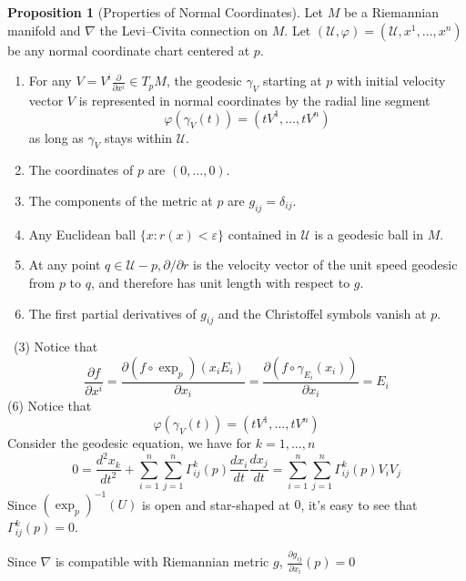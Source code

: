 \documentclass[12pt,a4paper]{book}
\newenvironment{prooff}{{\noindent\it\textcolor{cyan!40!black}{Proof}:}\,}{\par}
\newenvironment{enu}{\begin{enumerate}[(1)]}{\end{enumerate}}
\theoremstyle{definition}
\newtheorem{prop}[defn]{Proposition}
\begin{document}
\begin{prop}[Properties of Normal Coordinates]
    Let $M$ be a Riemannian manifold and $\nabla$ the Levi–Civita connection on $M$.
    Let $(\mathcal{U},\varphi)=(\mathcal{U},x^1,\dots,x^n)$
    be any normal coordinate chart centered at $p$.
    \begin{enu}
        \item For any $V=V^i \frac{\partial}{\partial x^i} \in T_p M$, the geodesic $\gamma_V$ starting at $p$ with initial velocity vector $V$ is represented in normal coordinates by the radial line segment
        $$
            \varphi(\gamma_V(t))=\left(t V^1, \ldots, t V^n\right)
        $$
        as long as $\gamma_V$ stays within $\mathcal{U}$.
        \item The coordinates of $p$ are $(0, \ldots, 0)$.
        \item The components of the metric at $p$ are $g_{i j}=\delta_{i j}$.
        \item Any Euclidean ball $\{x: r(x)<\varepsilon\}$ contained in $\mathcal{U}$ is a geodesic ball in $M$.
        \item At any point $q \in \mathcal{U}-p, \partial / \partial r$ is the velocity vector of the unit speed geodesic from $p$ to $q$, and therefore has unit length with respect to $g$.
        \item The first partial derivatives of $g_{i j}$ and the Christoffel symbols vanish at $p$.
    \end{enu}
\end{prop}
\begin{prooff}
    (3) Notice that
    $$
        \frac{\partial f}{\partial x^i}=\frac{\partial (f\circ\exp_p)(x_i E_i)}{\partial x_i}=\frac{\partial (f\circ\gamma_{E_i}(x_i))}{\partial x_i}=E_i
    $$
    (6)
    Notice that
    $$
        \varphi(\gamma_V(t))=\left(t V^1, \ldots, t V^n\right)
    $$
    Consider the geodesic equation, we have for $k=1,\dots,n$
    $$
        0=\frac{d^2 x_k}{d t^2}+\sum_{i=1}^n \sum_{j=1}^n\Gamma_{i j}^k(p) \frac{d x_i}{d t} \frac{d x_j}{d t}=\sum_{i=1}^n \sum_{j=1}^n\Gamma_{i j}^k(p)V_i V_j
    $$
    Since $(\exp_p)^{-1}(U)$ is open and star-shaped at $0$, it's easy to see that $\Gamma_{ij}^k(p)=0$.

    Since $\nabla$ is compatible with Riemannian metric $g$, $\frac{\partial g_{ij}}{\partial x_i}(p)=0$
\end{prooff}
\end{document}
